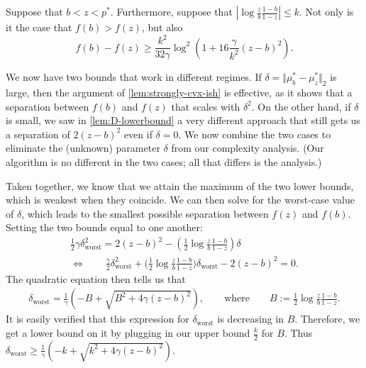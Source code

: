 \begin{lemma} \label{lem:togetherbound}
Suppose that $b < z < p^*$.
Furthermore, suppose that $| \log \frac{z}{b} \frac{1-b}{1-z}| \le k$.
Not only is it the case that $f(b) > f(z)$, but also
\[
    f(b) - f(z) \ge
        \frac{k^2}{32 \gamma}
        \log^2 \left( 1 +  16 \frac{\gamma}{k^2} (z-b)^2 \right)
        .
\]
\end{lemma}
\begin{lproof}
We now have two bounds that work in different regimes.
If $\delta = \Vert \mu_b^* - \mu_z^* \Vert_2$ is large, then the
    argument of \cref{lem:strongly-cvx-ish} is effective, as it shows that a separation between $f(b)$ and $f(z)$ that scales with $\delta^2$.
On the other hand, if $\delta$ is small, we saw in \cref{lem:D-lowerbound} a very different approach that still gets us a separation of $2(z-b)^2$
    even if $\delta = 0$.
We now combine the two cases to eliminate the (unknown) parameter $\delta$ from our complexity analysis.
(Our algorithm is no different in the two cases; all that differs is the analysis.)

Taken together, we know that we attain the maximum of the two lower bounds, which is weakest when they coincide. We can then solve for the worst-case value of $\delta$, which leads to the smallest possible separation between $f(z)$ and $f(b)$. Setting the two bounds equal to one another:
\begin{align*}
    \frac12 \gamma \delta_{\text{worst}}^2 =
        2 (z-b)^2 - \left(\frac{1}{2}
         \log  \frac zb \frac{1-b}{1-z} \right) \delta\\
    \iff\qquad
    \frac\gamma2  \delta_{\text{worst}}^2
    + \Big(\frac{1}{2} \log  \frac zb \frac{1-b}{1-z} \Big)\delta_{\text{worst}}
    - 2 (z-b)^2 = 0.
\end{align*}
The quadratic equation then tells us that
\begin{align*}
     \delta_{\text{worst}} = \frac{1}{\gamma}
        \left( -B + \sqrt{ B^2 + 4 \gamma (z-b)^2 } \right),
        \qquad\text{where}\qquad
        B := \frac{1}{2} \log  \frac zb \frac{1-b}{1-z} 
        .
\end{align*}
It is easily verified that this expression for $\delta_{\text{worst}}$ is decreasing in $B$.
Therefore, we get a lower bound on it by plugging in our upper bound $\frac{k}2$ for $B$.
Thus $\delta_{\text{worst}} \ge \frac{1}{\gamma}
   \left( -k + \sqrt{ k^2 + 4 \gamma (z-b)^2 } \right)$.


\end{lproof}
